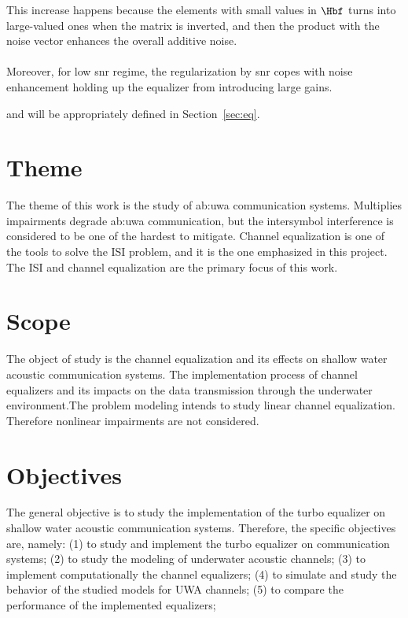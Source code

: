 
This increase happens because the elements with small values in $\Hbf$ turns into large-valued ones when the matrix is inverted, and then the product with the noise vector enhances the overall additive noise. 

\paragraph{}Moreover, for low \gls{snr} regime, the regularization by \gls{snr} copes with noise enhancement holding up the equalizer from introducing large gains.


and will be appropriately defined in Section~\ref{sec:eq}.

\section{Theme}
The theme of this work is the study of \gls{ab:uwa} communication systems. Multiplies impairments degrade \gls{ab:uwa} communication, but the intersymbol interference is considered to be one of the hardest to mitigate. Channel equalization is one of the tools to solve the ISI problem, and it is the one emphasized in this project. The ISI and channel equalization are the primary focus of this work. 
\section{Scope}
The object of study is the channel equalization and its effects on shallow water acoustic communication systems. The implementation process of channel equalizers and its impacts on the data transmission through the underwater environment.The problem modeling intends to study linear channel equalization. Therefore nonlinear impairments are not considered.  

\section{Objectives}

The general objective is to study the implementation of the turbo equalizer on shallow water acoustic communication systems. Therefore, the specific objectives are, namely: (1) to study and implement the turbo equalizer on communication systems; (2) to study the modeling of underwater acoustic channels; (3) to implement computationally the channel equalizers; (4) to simulate and study the behavior of the studied models for UWA channels; (5) to compare the performance of the implemented equalizers;


